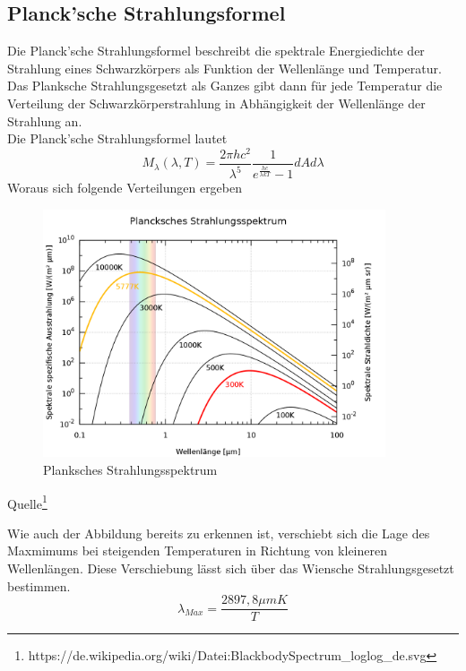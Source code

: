 \documentclass{article}
\begin{document}
    \subsection{Planck'sche Strahlungsformel}
        Die Planck'sche Strahlungsformel beschreibt die spektrale Energiedichte der Strahlung eines 
        Schwarzkörpers als Funktion der Wellenlänge und Temperatur. Das Planksche Strahlungsgesetzt als Ganzes
        gibt dann für jede Temperatur die Verteilung der Schwarzkörperstrahlung in Abhängigkeit der Wellenlänge der
        Strahlung an.\\
        Die Planck'sche Strahlungsformel lautet
        \begin{equation}
            M_{\lambda}(\lambda,T) = \frac{2\pi hc^2}{\lambda^5}\frac{1}{e^{\frac{hc}{\lambda kT}}-1}dAd\lambda
        \end{equation}
        Woraus sich folgende Verteilungen ergeben
        \begin{figure}[H]
            \centering
            \includegraphics[width=0.9\textwidth]{Images/PlanckStrahlung.png}
            \caption{Planksches Strahlungsspektrum}
        \end{figure}
        \begin{center}
            Quelle\footnote{https://de.wikipedia.org/wiki/Datei:BlackbodySpectrum\_loglog\_de.svg}
        \end{center}
        Wie auch der Abbildung bereits zu erkennen ist, verschiebt sich die Lage des Maxmimums bei steigenden
        Temperaturen in Richtung von kleineren Wellenlängen. Diese Verschiebung lässt sich über das Wiensche Strahlungsgesetzt
        bestimmen.
        \begin{equation}
            \lambda_{Max} = \frac{2897,8 \mu mK}{T}
        \end{equation}
\end{document}
